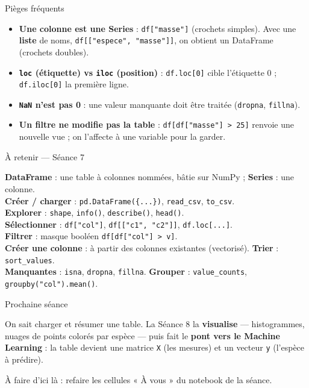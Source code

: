 \documentclass[aspectratio=169,11pt]{beamer}
\begin{document}
\begin{frame}{Pièges fréquents}
\begin{itemize}\small
  \item \textbf{Une colonne est une Series} : \texttt{df["masse"]} (crochets simples). Avec une \textbf{liste} de noms, \texttt{df[["espece", "masse"]]}, on obtient un DataFrame (crochets doubles).
  \item \textbf{\texttt{loc} (étiquette) vs \texttt{iloc} (position)} : \texttt{df.loc[0]} cible l'étiquette 0 ; \texttt{df.iloc[0]} la première ligne.
  \item \textbf{\texttt{NaN} n'est pas 0} : une valeur manquante doit être traitée (\texttt{dropna}, \texttt{fillna}).
  \item \textbf{Un filtre ne modifie pas la table} : \texttt{df[df["masse"] > 25]} renvoie une nouvelle vue ; on l'affecte à une variable pour la garder.
\end{itemize}
\end{frame}

\begin{frame}{À retenir — Séance 7}
\begin{ucadret}[L'essentiel]
{\small
\textbf{DataFrame} : une table à colonnes nommées, bâtie sur NumPy ; \textbf{Series} : une colonne.\\[2pt]
\textbf{Créer / charger} : \texttt{pd.DataFrame(\{...\})}, \texttt{read\_csv}, \texttt{to\_csv}.\\[2pt]
\textbf{Explorer} : \texttt{shape}, \texttt{info()}, \texttt{describe()}, \texttt{head()}.\\[2pt]
\textbf{Sélectionner} : \texttt{df["col"]}, \texttt{df[["c1", "c2"]]}, \texttt{df.loc[...]}.\\[2pt]
\textbf{Filtrer} : masque booléen \texttt{df[df["col"] > v]}.\\[2pt]
\textbf{Créer une colonne} : à partir des colonnes existantes (vectorisé). \textbf{Trier} : \texttt{sort\_values}.\\[2pt]
\textbf{Manquantes} : \texttt{isna}, \texttt{dropna}, \texttt{fillna}. \textbf{Grouper} : \texttt{value\_counts}, \texttt{groupby("col").mean()}.}
\end{ucadret}
\end{frame}

\begin{frame}{Prochaine séance}
\begin{ucaddef}
{\small On sait charger et résumer une table. La Séance 8 la \textbf{visualise} — histogrammes, nuages de points colorés par espèce — puis fait le \textbf{pont vers le Machine Learning} : la table devient une matrice \texttt{X} (les mesures) et un vecteur \texttt{y} (l'espèce à prédire).}
\end{ucaddef}
{\small À faire d'ici là : refaire les cellules « À vous » du notebook de la séance.}
\end{frame}
\end{document}
